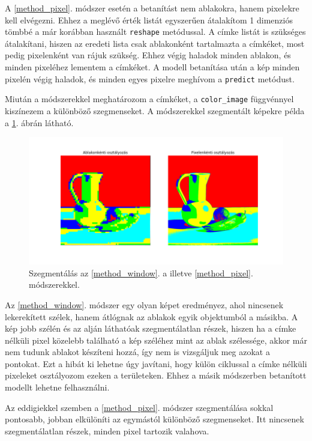 A \ref{method_pixel}. módszer esetén a betanítást nem ablakokra, hanem pixelekre kell elvégezni. Ehhez a meglévő érték listát egyszerűen átalakítom 1 dimenziós tömbbé a már korábban használt \texttt{reshape} metódussal. A címke listát is szükséges átalakítani, hiszen az eredeti lista csak ablakonként tartalmazta a címkéket, most pedig pixelenként van rájuk szükség. Ehhez végig haladok minden ablakon, és minden pixeléhez lementem a címkéket. A modell betanítása után a kép minden pixelén végig haladok, és minden egyes pixelre meghívom a \texttt{predict} metódust.

Miután a módszerekkel meghatározom a címkéket, a \texttt{color\_image} függvénnyel kiszínezem a különböző szegmenseket. A módszerekkel szegmentált képekre példa a \ref{fig:window_pixel_segmentation}. ábrán látható.

\begin{figure}[h]
\centering
\includegraphics[scale=0.5]{images/window_pixel_segmentation.png}
\caption{Szegmentálás az \ref{method_window}. a illetve \ref{method_pixel}. módszerekkel.}
\label{fig:window_pixel_segmentation}
\end{figure}

Az \ref{method_window}. módszer egy olyan képet eredményez, ahol nincsenek lekerekített szélek, hanem átlógnak az ablakok egyik objektumból a másikba. A kép jobb szélén és az alján láthatóak szegmentálatlan részek, hiszen ha a címke nélküli pixel közelebb található a kép széléhez mint az ablak szélessége, akkor már nem tudunk ablakot készíteni hozzá, így nem is vizsgáljuk meg azokat a pontokat. Ezt a hibát ki lehetne úgy javítani, hogy külön ciklussal a címke nélküli pixeleket osztályozom ezeken a területeken. Ehhez a másik módszerben betanított modellt lehetne felhasználni.

Az eddigiekkel szemben a \ref{method_pixel}. módszer szegmentálása sokkal pontosabb, jobban elkülöníti az egymástól különböző szegmenseket. Itt nincsenek szegmentálatlan részek, minden pixel tartozik valahova.

